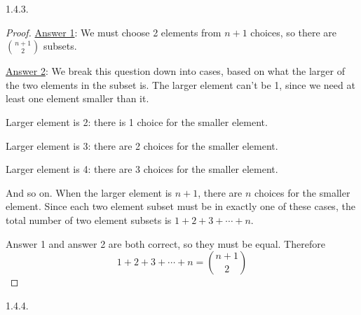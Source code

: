 \begin {itemize}
\begin{ans}{1.4.3.}
\begin{proof}
        \underline{Answer 1}: We must choose 2 elements from $n+1$ choices, so there are ${n+1 \choose 2}$ subsets.

        \underline{Answer 2}: We break this question down into cases, based on what the larger of the two elements in the subset is. The larger element can't be 1, since we need at least one element smaller than it.

        Larger element is 2: there is 1 choice for the smaller element.

        Larger element is 3: there are 2 choices for the smaller element.

        Larger element is 4: there are 3 choices for the smaller element.

        And so on.  When the larger element is $n+1$, there are $n$ choices for the smaller element.  Since each two element subset must be in exactly one of these cases, the total number of two element subsets is $1 + 2 + 3 + \cdots + n$.

        Answer 1 and answer 2 are both correct, so they must be equal.  Therefore
        \[1 + 2 + 3 + \cdots + n = {n+1 \choose 2}\]
       \end{proof}
	
\end{ans}
\begin{ans}{1.4.4.}
	

\end{ans}
\end{itemize}
